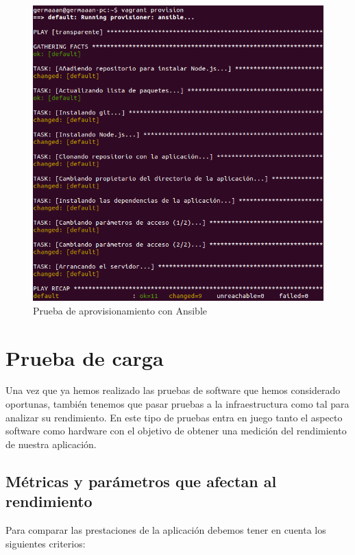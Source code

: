 \begin{figure}[!ht]
	\begin{center}
		\includegraphics[width=1\textwidth]{../images/provision.png}
		\caption{Prueba de aprovisionamiento con Ansible}
		\label{fig:provision}
	\end{center}
\end{figure}

\newpage
\section{Prueba de carga}

Una vez que ya hemos realizado las pruebas de software que hemos considerado oportunas, también tenemos que pasar pruebas a la infraestructura como tal para analizar su rendimiento. En este tipo de pruebas entra en juego tanto el aspecto software como hardware con el objetivo de obtener una medición del rendimiento de nuestra aplicación.

\newpage
\subsection{Métricas y parámetros que afectan al rendimiento}

Para comparar las prestaciones de la aplicación debemos tener en cuenta los siguientes criterios:

